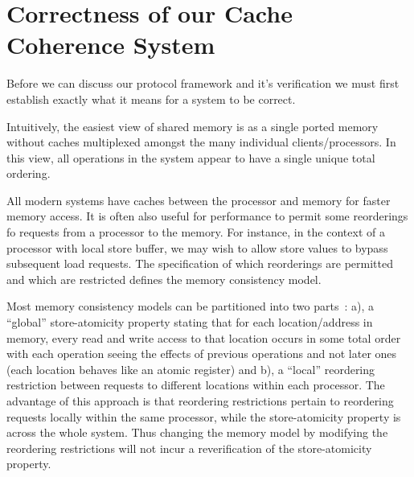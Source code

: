 \section{Correctness of our Cache Coherence System}

Before we can discuss our protocol framework and it's verification we
must first establish exactly what it means for a system to be
correct. 

Intuitively, the easiest view of shared memory is as a single ported
memory without caches multiplexed amongst the many individual clients/processors. In
this view, all operations in the system appear to have a single unique
total ordering.

All modern systems have caches between the processor and memory for faster memory access.
It is often also useful for performance to permit some reorderings fo requests from a processor to the memory.
For instance, in the context of a processor with local store buffer, we may
wish to allow store values to bypass subsequent load requests. The specification of
 which reorderings are permitted and which are restricted defines the memory consistency
model.


Most memory consistency models can be partitioned into two
parts~\cite{Arvind-memory-model}: a), a ``global'' store-atomicity
property stating that for each location/address in memory, every read and write access to that 
location occurs in some total order with each operation
seeing the effects of previous operations and not later ones (each location behaves like an atomic register) and b),
a ``local'' reordering restriction between requests to different
locations within each processor. The advantage of this approach is
that reordering restrictions pertain to reordering requests locally within
the same processor, while the store-atomicity property is across the whole
system. Thus changing the memory model
by modifying the reordering restrictions will not incur a reverification of
the store-atomicity property.


